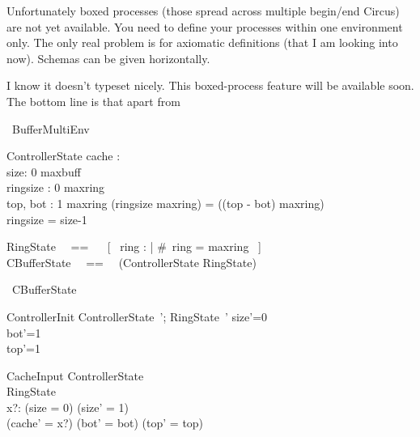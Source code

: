 \documentclass{article}
\begin{document}
Unfortunately boxed processes (those spread across multiple
begin/end Circus) are not yet available. You need to define your
processes within one environment only. The only real problem is for
axiomatic definitions (that I am looking into now). Schemas can be
given horizontally.

I know it doesn't typeset nicely. This boxed-process feature will be
available soon. The bottom line is that apart from

\begin{circus}
    \circprocess\ BufferMultiEnv \circdef \circbegin
\end{circus}

\begin{schema}{ControllerState}
    cache : \nat
\\%
   size: 0 \upto maxbuff
    \\%
    ringsize : 0 \upto maxring
    \\%
    top, bot : 1 \upto maxring
\where
        (ringsize \mod maxring) = ((top - bot) \mod maxring)
        \\%
        ringsize = size-1
\end{schema}

\begin{zed}
    RingState ~~== ~~ [~ ring : \seq \nat | \#~ring = maxring ~] \\
    CBufferState ~~==~~ (ControllerState \lor RingState)
\end{zed}

\begin{circusaction}
    \circstate\  CBufferState
\end{circusaction}

\begin{schema}{ControllerInit}
    ControllerState~'; RingState~'
\where
    size'=0 \\
    bot'=1 \\
    top'=1
\end{schema}

\begin{schema}{CacheInput}
   \Delta ControllerState
       \\%
       \Xi RingState
        \\%
        x?:\nat
\where
        (size = 0) \land (size' = 1)
        \\%
        (cache' = x?) \land (bot' = bot) \land (top' = top)
\end{schema}
\end{document}
